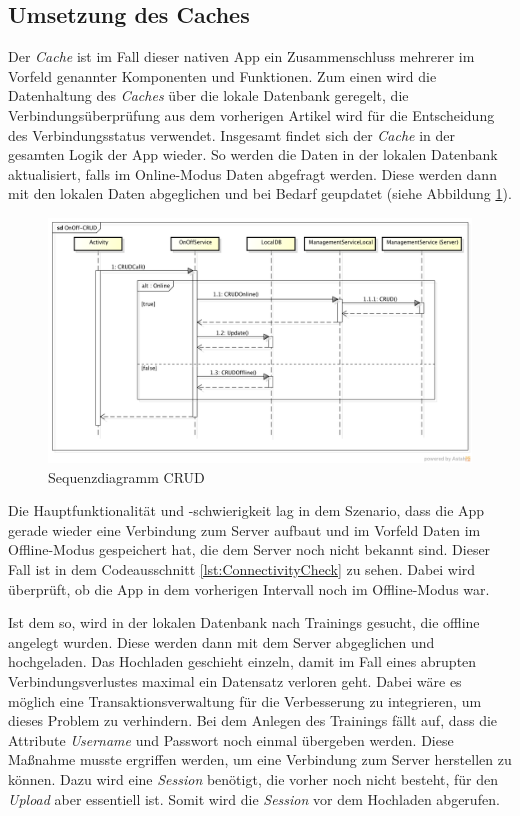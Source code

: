 \subsection{Umsetzung des Caches}
\label{ssec:nat-cache}
Der \textit{Cache} ist im Fall dieser nativen App ein Zusammenschluss mehrerer im Vorfeld genannter Komponenten und Funktionen. Zum einen wird die Datenhaltung des \textit{Caches} über die lokale Datenbank geregelt, die Verbindungsüberprüfung aus dem vorherigen Artikel wird für die Entscheidung des Verbindungsstatus verwendet. Insgesamt findet sich der \textit{Cache} in der gesamten Logik der App wieder. So werden die Daten in der lokalen Datenbank aktualisiert, falls im Online-Modus Daten abgefragt werden. Diese werden dann mit den lokalen Daten abgeglichen und bei Bedarf geupdatet (siehe Abbildung \ref{pic:nat-CRUD}).\\
\begin{figure}[!h]
\centering
\includegraphics[width=\linewidth]{content/images/fITNat-OnOff-CRUD}
\caption{Sequenzdiagramm CRUD}
\label{pic:nat-CRUD}
\end{figure}
Die Hauptfunktionalität und -schwierigkeit lag in dem Szenario, dass die App gerade wieder eine Verbindung zum Server aufbaut und im Vorfeld Daten im Offline-Modus gespeichert hat, die dem Server noch nicht bekannt sind. Dieser Fall ist in dem Codeausschnitt \ref{lst:ConnectivityCheck} zu sehen. Dabei wird überprüft, ob die App in dem vorherigen Intervall noch im Offline-Modus war. 

Ist dem so, wird in der lokalen Datenbank nach Trainings gesucht, die offline angelegt wurden. Diese werden dann mit dem Server abgeglichen und hochgeladen. Das Hochladen geschieht einzeln, damit im Fall eines abrupten Verbindungsverlustes maximal ein Datensatz verloren geht. Dabei wäre es möglich eine Transaktionsverwaltung für die Verbesserung zu integrieren, um dieses Problem zu verhindern. Bei dem Anlegen des Trainings fällt auf, dass die Attribute \textit{Username} und Passwort noch einmal übergeben werden. Diese Maßnahme musste ergriffen werden, um eine Verbindung zum Server herstellen zu können. Dazu wird eine \textit{Session} benötigt, die vorher noch nicht besteht, für den \textit{Upload} aber essentiell ist. Somit wird die \textit{Session} vor dem Hochladen abgerufen.